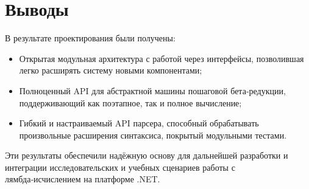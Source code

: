 \section{Выводы}

В результате проектирования были получены:
\begin{itemize}
  \item Открытая модульная архитектура с работой через интерфейсы, позволившая легко расширять систему новыми компонентами;
  \item Полноценный API для абстрактной машины пошаговой бета‑редукции, поддерживающий как поэтапное, так и полное вычисление;
  \item Гибкий и настраиваемый API парсера, способный обрабатывать произвольные расширения синтаксиса, покрытый модульными тестами.
\end{itemize}

Эти результаты обеспечили надёжную основу для дальнейшей разработки и интеграции исследовательских и учебных сценариев работы с лямбда‑исчислением на платформе .NET.
